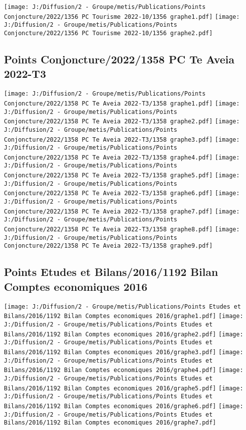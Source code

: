 \documentclass[
]{article}
\begin{document}
\texttt{[image: J:/Diffusion/2 - Groupe/metis/Publications/Points Conjoncture/2022/1356 PC Tourisme 2022-10/1356 graphe1.pdf]}
\texttt{[image: J:/Diffusion/2 - Groupe/metis/Publications/Points Conjoncture/2022/1356 PC Tourisme 2022-10/1356 graphe2.pdf]}

\hypertarget{points-conjoncture20221358-pc-te-aveia-2022-t3}{%
\subsection{Points Conjoncture/2022/1358 PC Te Aveia
2022-T3}\label{points-conjoncture20221358-pc-te-aveia-2022-t3}}

\texttt{[image: J:/Diffusion/2 - Groupe/metis/Publications/Points Conjoncture/2022/1358 PC Te Aveia 2022-T3/1358 graphe1.pdf]}
\texttt{[image: J:/Diffusion/2 - Groupe/metis/Publications/Points Conjoncture/2022/1358 PC Te Aveia 2022-T3/1358 graphe2.pdf]}
\texttt{[image: J:/Diffusion/2 - Groupe/metis/Publications/Points Conjoncture/2022/1358 PC Te Aveia 2022-T3/1358 graphe3.pdf]}
\texttt{[image: J:/Diffusion/2 - Groupe/metis/Publications/Points Conjoncture/2022/1358 PC Te Aveia 2022-T3/1358 graphe4.pdf]}
\texttt{[image: J:/Diffusion/2 - Groupe/metis/Publications/Points Conjoncture/2022/1358 PC Te Aveia 2022-T3/1358 graphe5.pdf]}
\texttt{[image: J:/Diffusion/2 - Groupe/metis/Publications/Points Conjoncture/2022/1358 PC Te Aveia 2022-T3/1358 graphe6.pdf]}
\texttt{[image: J:/Diffusion/2 - Groupe/metis/Publications/Points Conjoncture/2022/1358 PC Te Aveia 2022-T3/1358 graphe7.pdf]}
\texttt{[image: J:/Diffusion/2 - Groupe/metis/Publications/Points Conjoncture/2022/1358 PC Te Aveia 2022-T3/1358 graphe8.pdf]}
\texttt{[image: J:/Diffusion/2 - Groupe/metis/Publications/Points Conjoncture/2022/1358 PC Te Aveia 2022-T3/1358 graphe9.pdf]}

\hypertarget{points-etudes-et-bilans20161192-bilan-comptes-economiques-2016}{%
\subsection{Points Etudes et Bilans/2016/1192 Bilan Comptes economiques
2016}\label{points-etudes-et-bilans20161192-bilan-comptes-economiques-2016}}

\texttt{[image: J:/Diffusion/2 - Groupe/metis/Publications/Points Etudes et Bilans/2016/1192 Bilan Comptes economiques 2016/graphe1.pdf]}
\texttt{[image: J:/Diffusion/2 - Groupe/metis/Publications/Points Etudes et Bilans/2016/1192 Bilan Comptes economiques 2016/graphe2.pdf]}
\texttt{[image: J:/Diffusion/2 - Groupe/metis/Publications/Points Etudes et Bilans/2016/1192 Bilan Comptes economiques 2016/graphe3.pdf]}
\texttt{[image: J:/Diffusion/2 - Groupe/metis/Publications/Points Etudes et Bilans/2016/1192 Bilan Comptes economiques 2016/graphe4.pdf]}
\texttt{[image: J:/Diffusion/2 - Groupe/metis/Publications/Points Etudes et Bilans/2016/1192 Bilan Comptes economiques 2016/graphe5.pdf]}
\texttt{[image: J:/Diffusion/2 - Groupe/metis/Publications/Points Etudes et Bilans/2016/1192 Bilan Comptes economiques 2016/graphe6.pdf]}
\texttt{[image: J:/Diffusion/2 - Groupe/metis/Publications/Points Etudes et Bilans/2016/1192 Bilan Comptes economiques 2016/graphe7.pdf]}
\end{document}
